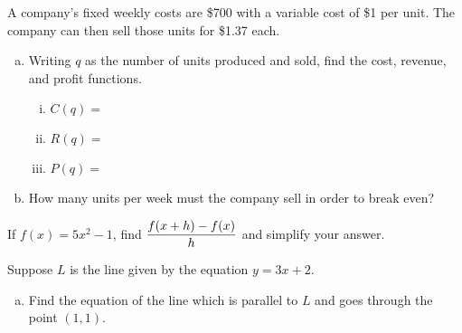 \documentclass[11pt]{exam}
\begin{document}
\addpoints

\noindent
\begin{center}
\gradetable[v][pages]  %
\end{center}


\newpage %

%
%
%

\begin{questions}

\question[4] A company's fixed weekly costs are \$700 with a variable cost of \$1 per unit.  The company can then sell those units for \$1.37 each.  
\begin{enumerate}[(a)]
\item Writing $q$ as the number of units produced and sold, find the cost, revenue, and profit functions.
\vspace{1cm}

\begin{enumerate}[(i)]
\item $C(q) =$
\vspace{1cm}

\item $R(q) =$
\vspace{1cm}

\item $P(q) =$
\vspace{1cm}
\end{enumerate}

\item How many units per week must the company sell in order to break even?
\end{enumerate}
\vspace{3cm}

\question[4] If $f(x) = 5x^2 - 1$, find $\displaystyle{\frac{f(x +h) - f(x)}{h}}$ and simplify your answer.
\newpage

\question[3] Suppose $L$ is the line given by the equation $y = 3x + 2$.
\begin{enumerate}[(a)]
\item Find the equation of the line which is parallel to $L$ and goes through the point $(1, 1)$.
\vspace{6cm}


\end{enumerate}
\end{questions}
\end{document}
